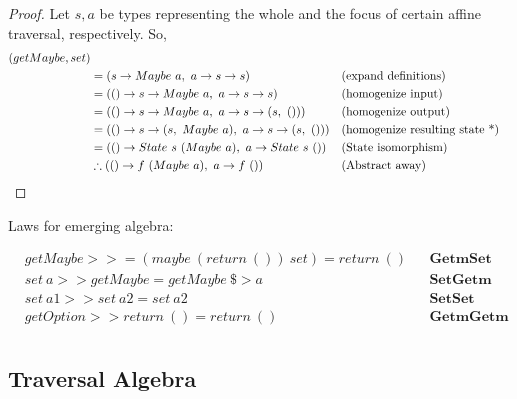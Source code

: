 \documentclass[a4paper]{article}
\begin{document}
\begin{proof}
  Let $s, a$ be types representing the whole and the focus of certain affine traversal, respectively. So,
  \begin{align*}
    (getMaybe, set) \\
    &= (s \rightarrow Maybe\ a,\ a \rightarrow s \rightarrow s) &&\text{(expand definitions)} \\
    &= (() \rightarrow s \rightarrow Maybe\ a,\ a \rightarrow s \rightarrow s) &&\text{(homogenize input)} \\
    &= (() \rightarrow s \rightarrow Maybe\ a,\ a \rightarrow s \rightarrow (s,\ ())) &&\text{(homogenize output)} \\
    &= (() \rightarrow s \rightarrow (s,\ Maybe\ a),\ a \rightarrow s \rightarrow (s,\ ())) &&\text{(homogenize resulting state *)} \\
    &= (() \rightarrow State\ s\ (Maybe\ a),\ a \rightarrow State\ s\ ()) &&\text{(State isomorphism)} \\
    &\therefore (() \rightarrow f\ (Maybe\ a),\ a \rightarrow f\ ()) &&\text{(Abstract away)}\qedhere
  \end{align*}
\end{proof}

Laws for emerging algebra:

\begin{align*}
  & getMaybe >>= (maybe\ (return\ ())\ set) = return\ () &&\textbf{GetmSet} \\
  & set\ a >> getMaybe = getMaybe\ \$> a &&\textbf{SetGetm} \\
  & set\ a1 >> set\ a2 = set\ a2 &&\textbf{SetSet} \\
  & getOption >> return\ () = return\ () &&\textbf{GetmGetm} \\
\end{align*}

\subsection{Traversal Algebra}

\end{document}
